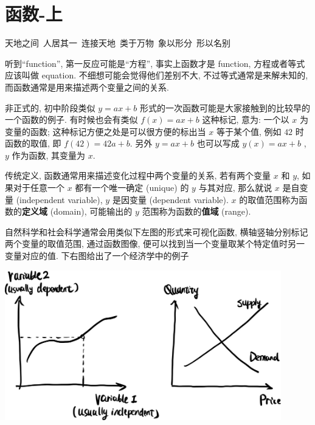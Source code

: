\section{函数-上}\label{003}

\begin{flushright}{\kaishu 天地之间\ 人居其一\ 连接天地\ 类于万物\ 象以形分\ 形以名别}\end{flushright}

\begin{tcolorbox}[size=fbox, breakable, enhanced jigsaw, title={函数 (function)}]

听到``function'', 第一反应可能是``方程'', 事实上函数才是 function,
方程或者等式应该叫做 equation. 不细想可能会觉得他们差别不大,
不过等式通常是来解未知的, 而函数通常是用来描述两个变量之间的关系.

非正式的, 初中阶段类似 $y=ax+b$
形式的一次函数可能是大家接触到的比较早的一个函数的例子. 有时候也会有类似
$f(x)=ax+b$ 这种标记, 意为: 一个以 $x$ 为变量的函数;
这种标记方便之处是可以很方便的标出当 $x$ 等于某个值, 例如 $42$
时函数的取值, 即 $f(42)=42a+b$. 另外 $y=ax+b$ 也可以写成
$y(x)=ax+b$ , $y$ 作为函数, 其变量为 $x$.

传统定义, 函数通常用来描述变化过程中两个变量的关系, 若有两个变量 $x$
和 $y$, 如果对于任意一个 $x$ 都有一个唯一确定 (unique) 的 $y$
与其对应, 那么就说 $x$ 是自变量 (independent variable), $y$ 是因变量
(dependent variable). $x$ 的取值范围称为函数的\textbf{定义域}
(domain), 可能输出的 $y$ 范围称为函数的\textbf{值域} (range).

自然科学和社会科学通常会用类似下左图的形式来可视化函数,
横轴竖轴分别标记两个变量的取值范围, 通过函数图像,
便可以找到当一个变量取某个特定值时另一变量对应的值.
下右图给出了一个经济学中的例子

\begin{tcolorbox}[size=fbox, breakable, enhanced jigsaw]
\begin{center}
\includegraphics[width=0.9\textwidth]{img/image-20230228095149998.png}
\end{center}


\end{tcolorbox}
\end{tcolorbox}
